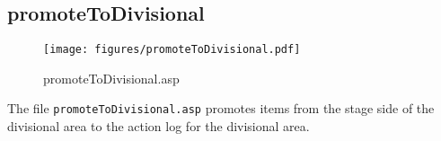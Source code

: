 \subsection{promoteToDivisional}
\begin{figure}[htb]
    \begin{center}
        \texttt{[image: figures/promoteToDivisional.pdf]}
    \end{center}
    \caption{promoteToDivisional.asp}
    \label{fig:promoteToDivisional}
\end{figure}

The file \verb|promoteToDivisional.asp| promotes items from the stage side of
the divisional area to the action log for the divisional area.
